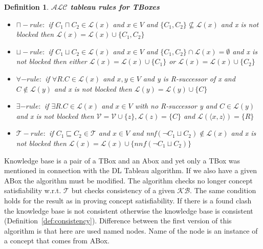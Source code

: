 \documentclass[12pt,a4paper]{article}
\newtheorem{definition}{Definition}[subsection]
\begin{document}
\begin{definition}{\textbf{$\mathcal{ALC}$ tableau rules for TBoxes}}
	\begin{itemize}
		\item $\sqcap-rule:$ if $C_{1} \sqcap C_{2} \in \mathcal{L}(x)$ and $x \in V$ and $\{ C_{1}, C_{2} \} \not \subseteq \mathcal{L}(x)$ and x is not blocked then $\mathcal{L}(x) = \mathcal{L}(x) \cup \{ C_{1}, C_{2} \}$
		
		\item $\sqcup-rule:$ if $C_{1} \sqcup C_{2} \in \mathcal{L}(x)$ and $x \in V$ and $ \{ C_{1}, C_{2} \} \cap \mathcal{L}(x) = \emptyset$ and x is not blocked then either $\mathcal{L}(x) = \mathcal{L}(x) \cup \{ C_{1} \}$ or $\mathcal{L}(x) = \mathcal{L}(x) \cup \{ C_{2} \}$
		
		\item $\forall-rule:$ if $\forall R.C \in \mathcal{L}(x)$ and $x,y \in V$ and y is R-successor of x and $C \not \in \mathcal{L}(y)$ and x is not blocked then $\mathcal{L}(y) = \mathcal{L}(y) \cup \{ C \}$
		
		\item $\exists-rule:$ if $\exists R.C \in \mathcal{L}(x)$ and $x \in V$ with no R-successor y and $C \in \mathcal{L}(y)$ and x is not blocked then $\mathcal{V} = \mathcal{V} \cup \{ z \}, \mathcal{L}(z) = \{ C\}$ and $\mathcal{L}( \langle x, z \rangle ) = \{ R \}$
		
		\item $\mathcal{T}-rule:$ if $C_{1} \sqsubseteq C_{2} \in \mathcal{T}$ and $x \in V$ and nnf$(\neg C_{1} \sqcup C_{2}) \not \in \mathcal{L}(x)$ and x is not blocked then $\mathcal{L}(x) = \mathcal{L}(x) \cup \{ nnf(\neg C_{1} \sqcup C_{2}) \}$
	\end{itemize}
\end{definition}	

Knowledge base is a pair of a TBox and an Abox and yet only a TBox was mentioned in connection with the DL Tableau algorithm. If we also have a given ABox the algorithm must be modified. The algorithm checks no longer concept satisfiability w.r.t. $\mathcal{T}$ but checks consistency of a given $\mathcal{KB}$. The same condition holds for the result as in proving concept satisfiability. If there is a found clash the knowledge base is not consistent otherwise the knowledge base is consistent (Definition~\ref{def:consistency}). Difference between the first version of this algorithm is that here are used named nodes. Name of the node is an instance of a concept that comes from ABox. 
\end{document}
